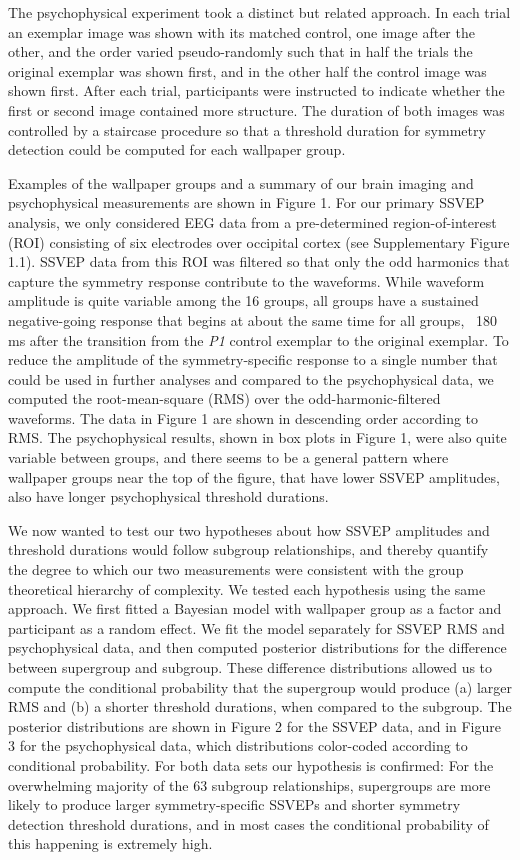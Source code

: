 \documentclass[9pt,twocolumn,twoside,lineno]{pnas-new}
\begin{document}
The psychophysical experiment took a distinct but related approach. In each trial an exemplar image was shown with its matched control, one image after the other, and the order varied pseudo-randomly such that in half the trials the original exemplar was shown first, and in the other half the control image was shown first. After each trial, participants were instructed to indicate whether the first or second image contained more structure. The duration of both images was controlled by a staircase procedure so that a threshold duration for symmetry detection could be computed for each wallpaper group. 

Examples of the wallpaper groups and a summary of our brain imaging and psychophysical measurements are shown in Figure 1. For our primary SSVEP analysis, we only considered EEG data from a pre-determined region-of-interest (ROI) consisting of six electrodes over occipital cortex (see Supplementary Figure 1.1). SSVEP data from this ROI was filtered so that only the odd harmonics that capture the symmetry response contribute to the waveforms. While waveform amplitude is quite variable among the 16 groups, all groups have a sustained negative-going response that begins at about the same time for all groups, ~180 ms after the transition from the \textit{P1} control exemplar to the original exemplar. To reduce the amplitude of the symmetry-specific response to a single number that could be used in further analyses and compared to the psychophysical data, we computed the root-mean-square (RMS) over the odd-harmonic-filtered waveforms. The data in Figure 1 are shown in descending order according to RMS. The psychophysical results, shown in box plots in Figure 1, were also quite variable between groups, and there seems to be a general pattern where wallpaper groups near the top of the figure, that have lower SSVEP amplitudes, also have longer psychophysical threshold durations. 

We now wanted to test our two hypotheses about how SSVEP amplitudes and threshold durations would follow subgroup relationships, and thereby quantify the degree to which our two measurements were consistent with the group theoretical hierarchy of complexity. We tested each hypothesis using the same approach. We first fitted a Bayesian model with wallpaper group as a factor and participant as a random effect. We fit the model separately for SSVEP RMS and psychophysical data, and then computed posterior distributions for the difference between supergroup and subgroup. These difference distributions allowed us to compute the conditional probability that the supergroup would produce (a) larger RMS and (b) a shorter threshold durations, when compared to the subgroup. The posterior distributions are shown in Figure 2 for the SSVEP data, and in Figure 3 for the psychophysical data, which distributions color-coded according to conditional probability. For both data sets our hypothesis is confirmed: For the overwhelming majority of the 63 subgroup relationships, supergroups are more likely to produce larger symmetry-specific SSVEPs and shorter symmetry detection threshold durations, and in most cases the conditional probability of this happening is extremely high. 
\end{document}
